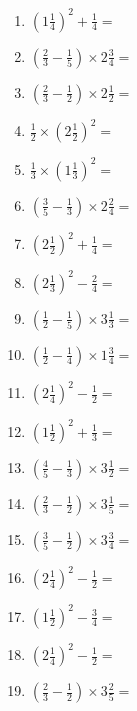 \documentclass[12pt]{article}
\begin{document}
\begin{enumerate}
\item \large $ \left( 1 \frac{1}{4} \right)^2 + \frac{1}{4} = $ \vspace{1.6cm}
\item \large $ \left( \frac{2}{3} - \frac{1}{5} \right) \times 2 \frac{3}{4} = $ \vspace{1.6cm}
\item \large $ \left( \frac{2}{3} - \frac{1}{2} \right) \times 2 \frac{1}{2} = $ \vspace{1.6cm}
\item \large $ \frac{1}{2} \times \left( 2 \frac{1}{2} \right)^2 = $ \vspace{1.6cm}
\item \large $ \frac{1}{3} \times \left( 1 \frac{1}{3} \right)^2 = $ \vspace{1.6cm}
\item \large $ \left( \frac{3}{5} - \frac{1}{3} \right) \times 2 \frac{2}{4} = $ \vspace{1.6cm}
\item \large $ \left( 2 \frac{1}{2} \right)^2 + \frac{1}{4} = $ \vspace{1.6cm}
\item \large $ \left( 2 \frac{1}{3} \right)^2 - \frac{2}{4} = $ \vspace{1.6cm}
\item \large $ \left( \frac{1}{2} - \frac{1}{5} \right) \times 3 \frac{1}{3} = $ \vspace{1.6cm}
\newpage
\item \large $ \left( \frac{1}{2} - \frac{1}{4} \right) \times 1 \frac{3}{4} = $ \vspace{1.6cm}
\item \large $ \left( 2 \frac{1}{4} \right)^2 - \frac{1}{2} = $ \vspace{1.6cm}
\item \large $ \left( 1 \frac{1}{2} \right)^2 + \frac{1}{3} = $ \vspace{1.6cm}
\item \large $ \left( \frac{4}{5} - \frac{1}{3} \right) \times 3 \frac{1}{2} = $ \vspace{1.6cm}
\item \large $ \left( \frac{2}{3} - \frac{1}{2} \right) \times 3 \frac{1}{5} = $ \vspace{1.6cm}
\item \large $ \left( \frac{3}{5} - \frac{1}{2} \right) \times 3 \frac{3}{4} = $ \vspace{1.6cm}
\item \large $ \left( 2 \frac{1}{4} \right)^2 - \frac{1}{2} = $ \vspace{1.6cm}
\item \large $ \left( 1 \frac{1}{2} \right)^2 - \frac{3}{4} = $ \vspace{1.6cm}
\item \large $ \left( 2 \frac{1}{4} \right)^2 - \frac{1}{2} = $ \vspace{1.6cm}
\item \large $ \left( \frac{2}{3} - \frac{1}{2} \right) \times 3 \frac{2}{5} = $ \vspace{1.6cm}
\end{enumerate}\newpage
\end{document}
